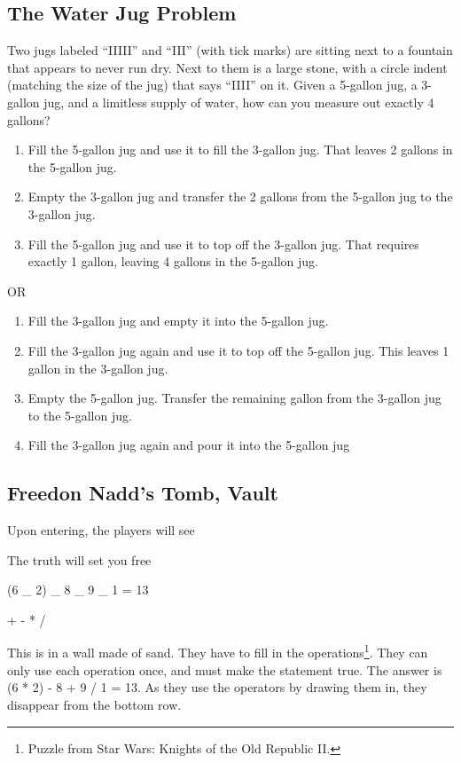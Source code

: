 \subsection{The Water Jug Problem}

Two jugs labeled ``IIIII'' and ``III'' (with tick marks) are sitting next to a fountain that appears to never run dry. Next to them is a large stone, with a circle indent (matching the size of the jug) that says ``IIII'' on it. Given a 5-gallon jug, a 3-gallon jug, and a limitless supply of water, how can you measure out exactly 4 gallons?

\begin{enumerate}
	\item Fill the 5-gallon jug and use it to fill the 3-gallon jug. That leaves 2 gallons in the 5-gallon jug.
	\item Empty the 3-gallon jug and transfer the 2 gallons from the 5-gallon jug to the 3-gallon jug.
	\item Fill the 5-gallon jug and use it to top off the 3-gallon jug. That requires exactly 1 gallon, leaving 4 gallons in the 5-gallon jug.
\end{enumerate}

OR

\begin{enumerate}
	\item Fill the 3-gallon jug and empty it into the 5-gallon jug.
	\item Fill the 3-gallon jug again and use it to top off the 5-gallon jug. This leaves 1 gallon in the 3-gallon jug.
	\item Empty the 5-gallon jug. Transfer the remaining gallon from the 3-gallon jug to the 5-gallon jug.
	\item Fill the 3-gallon jug again and pour it into the 5-gallon jug
\end{enumerate}

\subsection{Freedon Nadd's Tomb, Vault}

Upon entering, the players will see

\begin{center}
	The truth will set you free
	
	(6 \_ 2) \_ 8 \_ 9 \_ 1 = 13 
	
	+ - * / 
\end{center}

This is in a wall made of sand. They have to fill in the operations\footnote{Puzzle from Star Wars: Knights of the Old Republic II.}. They can only use each operation once, and must make the statement true. The answer is (6 * 2) - 8 + 9 / 1 = 13. As they use the operators by drawing them in, they disappear from the bottom row.


